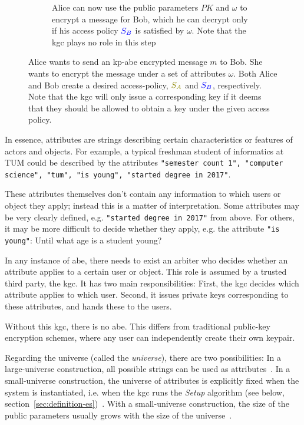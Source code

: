 \begin{figure}
\begin{subfigure}[c]{0.6\textwidth}
\begin{tikzpicture}[actor/.style={draw, minimum width=1.5cm}]
        \end{tikzpicture}
        \caption{Alice can now use the public parameters $PK$ and $\omega$ to encrypt a message for Bob, which he can decrypt only if his access policy $\textcolor{blue}{S_B}$ is satisfied by $\omega$. Note that the \acrshort{kgc} plays no role in this step}
    \end{subfigure}
    \caption[Interaction of Alice, Bob and KGC in an \acrshort{abes}]{
        Alice wants to send an \acrshort{kp-abe} encrypted message $m$ to Bob. She wants to encrypt the message under a set of attributes $\omega$.
        Both Alice and Bob create a desired \gls{access-policy}, $\textcolor{olive}{S_A}$ and $\textcolor{blue}{S_B}$, respectively.
        Note that the \acrshort{kgc} will only issue a corresponding key if it deems that they should be allowed to obtain a key under the given access policy.
    }
    \label{fig:abe-system}
\end{figure}
In essence, attributes are strings describing certain characteristics or features of actors and objects.
For example, a typical freshman student of informatics at TUM could be described by the attributes \texttt{"semester count 1", "computer science", "tum", "is young", "started degree in 2017"}.

These attributes themselves don't contain any information to which users or object they apply; instead this is a matter of interpretation.
Some attributes may be very clearly defined, e.g. \texttt{"started degree in 2017"} from above.
For others, it may be more difficult to decide whether they apply, e.g. the attribute \texttt{"is young"}: Until what age is a student young?

In any instance of \acrshort{abe}, there needs to exist an arbiter who decides whether an attribute applies to a certain user or object.
This role is assumed by a trusted third party, the \acrfull{kgc}.
It has two main responsibilities: First, the \acrshort{kgc} decides which attribute applies to which user.
Second, it issues private keys corresponding to these attributes, and hands these to the users.

Without this \acrshort{kgc}, there is no \acrshort{abe}.
This differs from traditional public-key encryption schemes, where any user can independently create their own keypair.

Regarding the \glsdesc{universe} (called the \emph{\gls{universe}}), there are two possibilities:
In a \gls{large-universe} construction, all possible strings can be used as attributes~\cite{goyal_attribute-based_2006}.
In a \gls{small-universe} construction, the universe of attributes is explicitly fixed when the system is instantiated, i.e. when the \acrshort{kgc} runs the \emph{Setup} algorithm (see below, section~\ref{sec:definition-es})~\cite{goyal_attribute-based_2006}.
With a \gls{small-universe} construction, the size of the public parameters usually grows with the size of the \gls{universe}~\cite{goyal_attribute-based_2006}.

